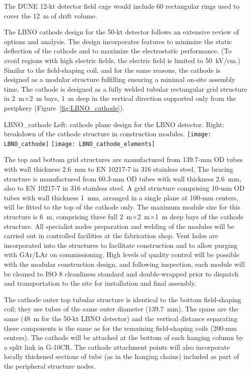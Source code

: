 The DUNE  12-kt detector field cage would include 60 rectangular rings used to cover the 12~m of drift volume.

The LBNO cathode design for the 50-kt detector follows an extensive
review of options and analysis. The design incorporates features to
minimize the static deflection of the cathode and to maximize the
electrostatic performance. (To avoid regions with high electric
fields, the electric field is limited to 50~kV/cm.)  Similar to the
field-shaping coil, and for the same reasons, the cathode is designed
as a modular structure fulfilling ensuring a minimal on-site assembly
time. The cathode is designed as a fully welded tubular rectangular
grid structure in 2~m$\times$2~m bays, 1~m deep in the vertical
direction supported only from the periphery
(Figure~\ref{fig:LBNO_cathode}).
\begin{cdrfigure}{LBNO_cathode}
{\small Left: cathode plane design for the LBNO detector. Right: breakdown of 
the cathode structure in construction modules.}
\texttt{[image: LBNO\_cathode]} \hfil
\texttt{[image: LBNO\_cathode\_elements]}
\end{cdrfigure}

The top and bottom grid structures are manufactured from 139.7-mm OD
tubes with wall thickness 2.6~mm to EN 10217-7 in 316 stainless steel.
The bracing structure is manufactured from 60.3-mm OD tubes with wall
thickness 2.6~mm, also to EN 10217-7 in 316 stainless steel.  A grid
structure comprising 10-mm OD tubes with wall thickness 1~mm, arranged
in a single plane at 100-mm centers, will be fitted to the top of the
cathode only. The maximum module size for this structure is 6~m,
comprising three full 2~m$\times$2~m$\times$1~m deep bays of the
cathode structure.  All specialist nodes preparation and welding of
the modules will be carried out in controlled facilities at the
fabrication shop.  Vent holes are incorporated into the structures to
facilitate construction and to allow purging with GAr/LAr on
commissioning. High levels of quality control will be possible with
the modular construction design, and following inspection, each module
will be cleaned to ISO 8 cleanliness standard and double-wrapped prior
to dispatch and transportation to the site for installation and final
assembly.

The cathode outer top tubular structure is identical to the bottom
field-shaping coil; they use tubes of the same outer diameter
(139.7~mm).  The spans are the same (48~m for the 50-kt LBNO detector)
and the vertical distance separating these components is the same as
for the remaining field-shaping coils (200-mm centers). The cathode
will be attached at the bottom of each hanging column by a split link
in G-10CR. The cathode attachment points will also incorporate locally
thickened sections of tube (as in the hanging chains) included as part
of the peripheral structure nodes.
 
